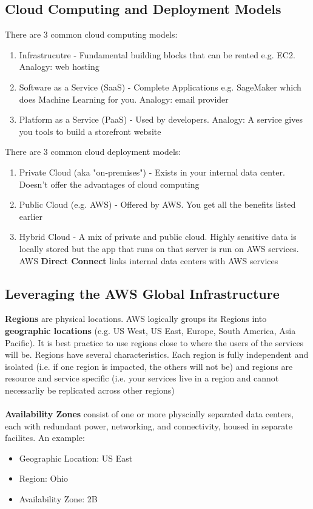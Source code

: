 \documentclass{article}%
\begin{document}
\subsection{Cloud Computing and Deployment Models}
There are 3 common cloud computing models:
\begin{enumerate}
    \item Infrastrucutre - Fundamental building blocks that can be rented e.g. EC2. Analogy: web hosting
    \item Software as a Service (SaaS) - Complete Applications e.g. SageMaker which does Machine Learning for you. Analogy: email provider
    \item Platform as a Service (PaaS) - Used by developers. Analogy: A service gives you tools to build a storefront website 
\end{enumerate}
There are 3 common cloud deployment models:
\begin{enumerate}
    \item Private Cloud (aka "on-premises") - Exists in your internal data center. Doesn't offer the advantages of cloud computing
    \item Public Cloud (e.g. AWS) - Offered by AWS. You get all the benefits listed earlier
    \item Hybrid Cloud - A mix of private and public cloud. Highly sensitive data is locally stored but the app that runs on that server is run on AWS services. AWS \textbf{Direct Connect} links internal data centers with AWS services
\end{enumerate}
\subsection{Leveraging the AWS Global Infrastructure}
\textbf{Regions} are physical locations. AWS logically groups its Regions into \textbf{geographic locations} (e.g. US West, US East, Europe, South America, Asia Pacific).
It is best practice to use regions close to where the users of the services will be. Regions have several characteristics. Each region is fully independent and isolated (i.e. if one region is impacted, the others will not be) and regions are resource and service specific (i.e. your services live in a region and cannot necessarliy be replicated across other regions) \\ \\

\textbf{Availability Zones} consist of one or more physcially separated data centers, each with redundant power, networking, and connectivity, housed in separate facilites. An example:
\begin{itemize}
    \item Geographic Location: US East
    \item Region: Ohio
    \item Availability Zone: 2B
\end{itemize}
\end{document}
